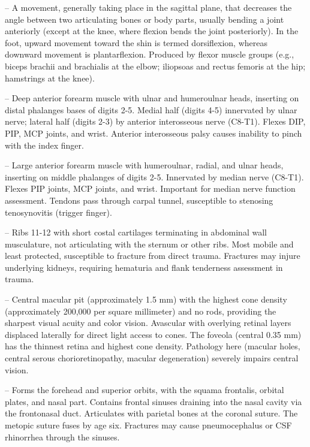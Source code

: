 -- A movement, generally taking place in the sagittal plane, that decreases the angle between two articulating bones or body parts, usually bending a joint anteriorly (except at the knee, where flexion bends the joint posteriorly). In the foot, upward movement toward the shin is termed dorsiflexion, whereas downward movement is plantarflexion. Produced by flexor muscle groups (e.g., biceps brachii and brachialis at the elbow; iliopsoas and rectus femoris at the hip; hamstrings at the knee).

-- Deep anterior forearm muscle with ulnar and humeroulnar heads, inserting on distal phalanges bases of digits 2-5. Medial half (digits 4-5) innervated by ulnar nerve; lateral half (digits 2-3) by anterior interosseous nerve (C8-T1). Flexes DIP, PIP, MCP joints, and wrist. Anterior interosseous palsy causes inability to pinch with the index finger.

-- Large anterior forearm muscle with humeroulnar, radial, and ulnar heads, inserting on middle phalanges of digits 2-5. Innervated by median nerve (C8-T1). Flexes PIP joints, MCP joints, and wrist. Important for median nerve function assessment. Tendons pass through carpal tunnel, susceptible to stenosing tenosynovitis (trigger finger).

-- Ribs 11-12 with short costal cartilages terminating in abdominal wall musculature, not articulating with the sternum or other ribs. Most mobile and least protected, susceptible to fracture from direct trauma. Fractures may injure underlying kidneys, requiring hematuria and flank tenderness assessment in trauma.

-- Central macular pit (approximately 1.5 mm) with the highest cone density (approximately 200,000 per square millimeter) and no rods, providing the sharpest visual acuity and color vision. Avascular with overlying retinal layers displaced laterally for direct light access to cones. The foveola (central 0.35 mm) has the thinnest retina and highest cone density. Pathology here (macular holes, central serous chorioretinopathy, macular degeneration) severely impairs central vision.

-- Forms the forehead and superior orbits, with the squama frontalis, orbital plates, and nasal part. Contains frontal sinuses draining into the nasal cavity via the frontonasal duct. Articulates with parietal bones at the coronal suture. The metopic suture fuses by age six. Fractures may cause pneumocephalus or CSF rhinorrhea through the sinuses.

